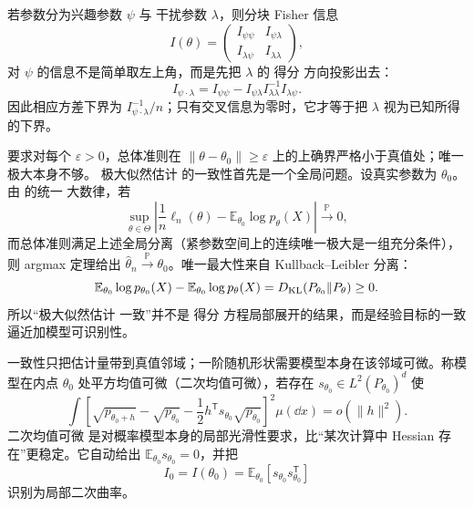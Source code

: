 \begin{proposition}
若参数分为兴趣参数 $\psi$ 与 干扰参数 $\lambda$，则分块 Fisher 信息
\[
I(\theta)=\begin{pmatrix}I_{\psi\psi}&I_{\psi\lambda}\\I_{\lambda\psi}&I_{\lambda\lambda}\end{pmatrix},
\]
对 $\psi$ 的信息不是简单取左上角，而是先把 $\lambda$ 的 得分 方向投影出去：
\[
 I_{\psi\cdot\lambda}
 =I_{\psi\psi}-I_{\psi\lambda}I_{\lambda\lambda}^{-1}I_{\lambda\psi}.
\]
因此相应方差下界为 $I_{\psi\cdot\lambda}^{-1}/n$；只有交叉信息为零时，它才等于把 $\lambda$ 视为已知所得的下界。
\end{proposition}

\begin{theorem}
要求对每个 $\varepsilon>0$，总体准则在 $\|\theta-\theta_0\|\ge\varepsilon$ 上的上确界严格小于真值处；唯一极大本身不够。
极大似然估计 的一致性首先是一个全局问题。设真实参数为 $\theta_0$。由  的统一 大数律，若
\[
 \sup_{\theta\in\Theta}
 \left|
 \frac1n\ell_n(\theta)
 -\mathbb E_{\theta_0}\log p_\theta(X)
 \right|\xrightarrow{\mathbb P}0,
\]
而总体准则满足上述全局分离（紧参数空间上的连续唯一极大是一组充分条件），则 argmax 定理给出 $\widehat\theta_n\xrightarrow{\mathbb P}\theta_0$。唯一最大性来自 Kullback--Leibler 分离：
\[
 \mathbb E_{\theta_0}\log p_{\theta_0}(X)
 -\mathbb E_{\theta_0}\log p_\theta(X)
 =D_{\rm KL}(P_{\theta_0}\Vert P_\theta)\ge0.
\]
所以“极大似然估计 一致”并不是 得分 方程局部展开的结果，而是经验目标的一致逼近加模型可识别性。
\end{theorem}

\begin{definition}[二次均值可微]
一致性只把估计量带到真值邻域；一阶随机形状需要模型本身在该邻域可微。称模型在内点 $\theta_0$ 处平方均值可微（二次均值可微），若存在 $s_{\theta_0}\in L^2(P_{\theta_0})^d$ 使
\begin{equation*}\int\left[
 \sqrt{p_{\theta_0+h}}
 -\sqrt{p_{\theta_0}}
 -\frac12h^{\mathsf T}s_{\theta_0}\sqrt{p_{\theta_0}}
 \right]^2\mu(\dd x)
 =o(\|h\|^2).
\end{equation*}
二次均值可微 是对概率模型本身的局部光滑性要求，比“某次计算中 Hessian 存在”更稳定。它自动给出 $\mathbb E_{\theta_0}s_{\theta_0}=0$，并把
\[
 I_0=I(\theta_0)
 =\mathbb E_{\theta_0}[s_{\theta_0}s_{\theta_0}^{\mathsf T}]
\]
识别为局部二次曲率。
\end{definition}


